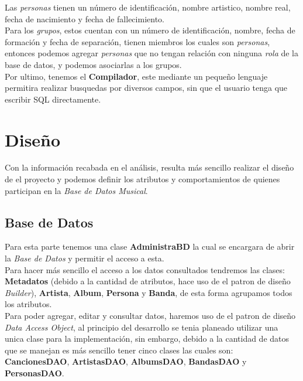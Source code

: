\documentclass[12pt]{report}
\begin{document}
Las \textit{personas} tienen un número de identificación, nombre artistico, nombre real, fecha de nacimiento y fecha de fallecimiento.\\

Para los \textit{grupos}, estos cuentan con un número de identificación, nombre, fecha de formación y fecha de separación, tienen miembros los cuales son \textit{personas}, entonces podemos agregar \textit{personas} que no tengan relación con ninguna \textit{rola} de la base de datos, y podemos asociarlas a los grupos.\\

Por ultimo, tenemos el \textbf{Compilador}, este mediante un pequeño lenguaje permitira realizar busquedas por diversos campos, sin que el usuario tenga que escribir SQL directamente.\\

\section{Diseño}
Con la información recabada en el análisis, resulta más sencillo realizar el diseño de el proyecto y podemos definir los atributos y comportamientos de quienes participan en la \textit{Base de Datos Musical}.\\

\subsection{Base de Datos}
Para esta parte tenemos una clase \textbf{AdministraBD} la cual se encargara de abrir la \textit{Base de Datos} y permitir el acceso a esta.\\

Para hacer más sencillo el acceso a los datos consultados tendremos las clases: \textbf{Metadatos} (debido a la cantidad de atributos, hace uso de el patron de diseño \textit{Builder}), \textbf{Artista}, \textbf{Album}, \textbf{Persona} y \textbf{Banda}, de esta forma agrupamos todos los atributos.\\

Para poder agregar, editar y consultar datos, haremos uso de el patron de diseño \textit{Data Access Object}, al principio del desarrollo se tenia planeado utilizar una unica clase para la implementación, sin embargo, debido a la cantidad de datos que se manejan es más sencillo tener cinco clases las cuales son: \textbf{CancionesDAO}, \textbf{ArtistasDAO}, \textbf{AlbumsDAO}, \textbf{BandasDAO} y \textbf{PersonasDAO}.\\
\end{document}
